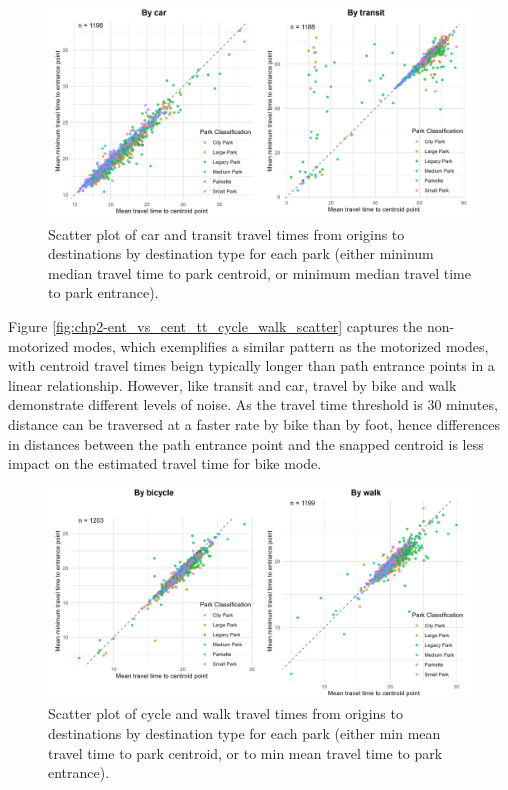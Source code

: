 \documentclass[
11pt, %
oneside, %
english, %
singlespacing, %
]{macthesis} %
\begin{document}
\begin{figure}

{\centering \includegraphics[width=6in]{./data/figures/chp2-ent_vs_cent_tt_transit_car_scatter} 

}

\caption{\label{fig:chp2-ent_vs_cent_tt_car_transit_scatter} Scatter plot of car and transit travel times from origins to destinations by destination type for each park (either mininum median travel time to park centroid, or minimum median travel time to park entrance). }\label{fig:unnamed-chunk-10}
\end{figure}

Figure \ref{fig:chp2-ent_vs_cent_tt_cycle_walk_scatter} captures the non-motorized modes, which exemplifies a similar pattern as the motorized modes, with centroid travel times beign typically longer than path entrance points in a linear relationship. However, like transit and car, travel by bike and walk demonstrate different levels of noise. As the travel time threshold is 30 minutes, distance can be traversed at a faster rate by bike than by foot, hence differences in distances between the path entrance point and the snapped centroid is less impact on the estimated travel time for bike mode.

\begin{figure}

{\centering \includegraphics[width=6in]{./data/figures/chp2-ent_vs_cent_tt_walk_cycle_scatter} 

}

\caption{\label{fig:chp2-ent_vs_cent_tt_cycle_walk_scatter}  Scatter plot of cycle and walk travel times from origins to destinations by destination type for each park (either min mean travel time to park centroid, or to min mean travel time to park entrance). }\label{fig:unnamed-chunk-11}
\end{figure}
\end{document}
